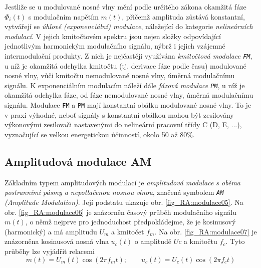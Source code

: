       Jestliže se u modulované nosné vlny mění podle určitého zákona okamžitá fáze \(\Phi_i(t)\) s 
      modulačním napětím \(m(t)\), přičemž amplituda zůstává konstantní, vytvářejí se \emph{úhlové 
      (exponenciální) modulace}, náležející do kategorie \emph{nelineárních modulací}. V jejich 
      kmitočtovém spektru jsou nejen složky odpovídající jednotlivým harmonickým modulačního 
      signálu, nýbrž i jejich vzájemné intermodulační produkty. Z nich je nejčastěji využívána 
      \emph{kmitočtová modulace \texttt{FM}}, u níž je okamžitá odchylka kmitočtu (tj. derivace 
      fáze podle času) modulované nosné vlny, vůči kmitočtu nemodulované nosné vlny, úměrná 
      modulačnímu signálu. K exponenciálním modulacím náleží dále \emph{fázová modulace 
      \texttt{PM}}, u níž je okamžitá odchylka fáze, od fáze nemodulované nosné vlny, úměrná 
      modulačnímu signálu. Modulace \texttt{FM} a \texttt{PM} mají konstantní obálku modulované 
      nosné vlny. To je v praxi výhodné, neboť signály s konstantní obálkou mohou být zesilovány 
      výkonovými zesilovači nastavenými do nelineární pracovní třídy C (D, E, ...), vyznačující se 
      velkou energetickou účinností, okolo \num{50} až \num{80}\%.
      
    \subsection{Amplitudová modulace AM}
      Základním typem amplitudových modulací je \emph{amplitudová modulace s oběma postranními 
      pásmy a nepotlačenou nosnou vlnou}, značená symbolem \emph{\texttt{AM} (Amplitude 
      Modulation)}. Její podstatu ukazuje obr. \ref{fig_RA:modulace05}. Na obr. 
      \ref{fig_RA:modulace06} je znázorněn časový průběh modulačního signálu \(m(t)\), o němž 
      nejprve pro jednoduchost předpokládejme, že je kosinusový (harmonický) a má amplitudu 
      \(U_m\) a kmitočet \(f_m\). Na obr. \ref{fig_RA:modulace07} je znázorněna kosinusová nosná 
      vlna \(u_c(t)\) o amplitudě \(Uc\) a kmitočtu \(f_c\). Tyto průběhy lze vyjádřit relacemi
      \begin{equation}\label{eq:RA_mdlc_02}
        m(t) = U_m(t)\cos(2\pi f_m t); \qquad u_c(t) = U_c(t)\cos(2\pi f_c t)
      \end{equation}


